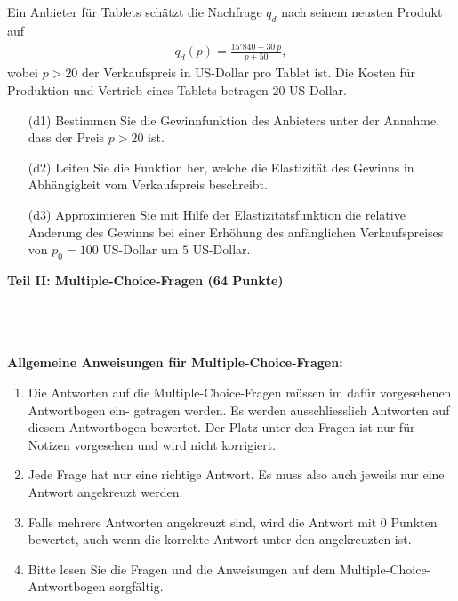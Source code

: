 \subsection*{}
Ein Anbieter für Tablets schätzt die Nachfrage $ q_d $ nach seinem neusten Produkt auf
\begin{align*}
	q_d(p)
	=
	\frac{15'840 - 30 \ p}{p + 50},
\end{align*}
wobei $ p > 20  $ der Verkaufspreis in US-Dollar pro Tablet ist.
Die Kosten für Produktion und Vertrieb eines Tablets betragen $ 20  $ US-Dollar.
\begin{enumerate}
	\item[(d1)]
	Bestimmen Sie die Gewinnfunktion des Anbieters unter der Annahme, dass der Preis $ p > 20 $ ist.
	\item[(d2)]
	Leiten Sie die Funktion her, welche die Elastizität des Gewinns in Abhängigkeit vom Verkaufspreis beschreibt.
	\item[(d3)]
	Approximieren Sie mit Hilfe der Elastizitätsfunktion die relative Änderung des Gewinns bei einer Erhöhung des anfänglichen Verkaufspreises von $ p_0 = 100 $ US-Dollar um $ 5 $ US-Dollar.
\end{enumerate}

\newpage


\begin{Large}
\textbf{Teil II: Multiple-Choice-Fragen (64 Punkte)}
\end{Large}
\\
\\
\\
\textbf{Allgemeine Anweisungen für Multiple-Choice-Fragen:}
\\
\renewcommand{\labelenumi}{(\roman{enumi})}
\begin{enumerate}
\item
Die Antworten auf die Multiple-Choice-Fragen müssen im dafür vorgesehenen Antwortbogen ein-
getragen werden. Es werden ausschliesslich Antworten auf diesem Antwortbogen bewertet. Der
Platz unter den Fragen ist nur für Notizen vorgesehen und wird nicht korrigiert.

\item
Jede Frage hat nur eine richtige Antwort. Es muss also auch jeweils nur eine Antwort angekreuzt werden.

\item
Falls mehrere Antworten angekreuzt sind, wird die Antwort mit 0 Punkten bewertet, auch wenn
die korrekte Antwort unter den angekreuzten ist.

\item
Bitte lesen Sie die Fragen und die Anweisungen auf dem Multiple-Choice-Antwortbogen sorgfältig.

\end{enumerate}
\newpage
